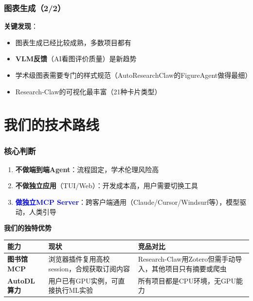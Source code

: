 \documentclass[
  aspectratio=169,
  presentation,
  titlegraphic=./images/bit_logo.pdf,
  framelogo=./images/bit_logo.pdf
]{bitbeamer}
\begin{document}
\begin{frame}[t]
  \frametitle{图表生成（2/2）}

  \textbf{关键发现}：
  \begin{itemize}
    \item 图表生成已经比较成熟，多数项目都有
    \item \textbf{VLM反馈}（AI看图评价质量）是新趋势
    \item 学术级图表需要专门的样式规范（AutoResearchClaw的FigureAgent做得最细）
    \item Research-Claw的可视化最丰富（21种卡片类型）
  \end{itemize}

\end{frame}

\section{我们的技术路线}

\begin{frame}[t]
  \frametitle{核心判断}

  \begin{enumerate}
    \item \textbf{不做端到端Agent}：流程固定，学术伦理风险高
    \item \textbf{不做独立应用}（TUI/Web）：开发成本高，用户需要切换工具
    \item \textcolor{blue}{\textbf{做独立MCP Server}}：跨客户端通用（Claude/Cursor/Windsurf等），模型驱动，人类引导
  \end{enumerate}

  \vspace{0.5cm}

  \textbf{我们的独特优势}

  \begin{table}
    \centering
    \small
    \begin{tabular}{p{2.5cm}p{4.5cm}p{5cm}}
      \toprule
      \textbf{能力} & \textbf{现状} & \textbf{竞品对比} \\
      \midrule
      \textbf{图书馆MCP} & 浏览器插件复用高校session，合规获取订阅内容 & Research-Claw用Zotero但需手动导入，其他项目只有摘要或爬虫 \\
      \midrule
      \textbf{AutoDL算力} & 用户已有GPU实例，可直接执行ML实验 & 所有项目都是CPU环境，无GPU能力 \\
      \bottomrule
    \end{tabular}
  \end{table}

\end{frame}
\end{document}
